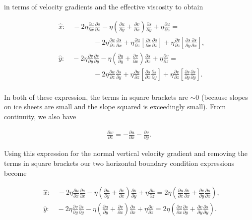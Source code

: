 in terms of velocity gradients and the effective viscosity to obtain

\begin{align*}
   {} & \hat{x}:\quad -2\eta \frac{\partial u}{\partial x}\frac{\partial s}{\partial x}-\eta \left( \frac{\partial u}{\partial y}+\frac{\partial v}{\partial x} \right)\frac{\partial s}{\partial y}+\eta \frac{\partial u}{\partial z}=  \\
   {} & \quad \quad \quad \quad \quad -2\eta \frac{\partial w}{\partial z}\frac{\partial s}{\partial x}+\eta \frac{\partial u}{\partial z}\left[ \frac{\partial s}{\partial x}\frac{\partial s}{\partial x} \right]+\eta \frac{\partial v}{\partial z}\left[ \frac{\partial s}{\partial y}\frac{\partial s}{\partial x} \right],  \\
%
   {} & \hat{y}:\quad -2\eta \frac{\partial v}{\partial y}\frac{\partial s}{\partial y}-\eta \left( \frac{\partial u}{\partial y}+\frac{\partial v}{\partial x} \right)\frac{\partial s}{\partial x}+\eta \frac{\partial v}{\partial z}=  \\
   {} & \quad \quad \quad \quad \quad -2\eta \frac{\partial w}{\partial z}\frac{\partial s}{\partial y}+\eta \frac{\partial u}{\partial z}\left[ \frac{\partial s}{\partial x}\frac{\partial s}{\partial y} \right]+\eta \frac{\partial v}{\partial z}\left[ \frac{\partial s}{\partial y}\frac{\partial s}{\partial y} \right].  \\
\end{align*}

In both of these expression, the terms in square brackets are $\sim{0}$ (because slopes on ice sheets are small and the slope squared is exceedingly small). From continuity, we also have

\begin{align*}
\frac{\partial w}{\partial z}=-\frac{\partial u}{\partial x}-\frac{\partial v}{\partial y}.
\end{align*}

Using this expression for the normal vertical velocity gradient and removing the terms in square brackets our two horizontal boundary condition expressions become

\begin{align*}
   {} & \hat{x}:\quad -2\eta \frac{\partial u}{\partial x}\frac{\partial s}{\partial x}-\eta \left( \frac{\partial u}{\partial y}+\frac{\partial v}{\partial x} \right)\frac{\partial s}{\partial y}+\eta \frac{\partial u}{\partial z}=2\eta \left( \frac{\partial u}{\partial x}\frac{\partial s}{\partial x}+\frac{\partial v}{\partial y}\frac{\partial s}{\partial x} \right),  \\
   {} & \hat{y}:\quad -2\eta \frac{\partial v}{\partial y}\frac{\partial s}{\partial y}-\eta \left( \frac{\partial u}{\partial y}+\frac{\partial v}{\partial x} \right)\frac{\partial s}{\partial x}+\eta \frac{\partial v}{\partial z}=2\eta \left( \frac{\partial u}{\partial x}\frac{\partial s}{\partial y}+\frac{\partial v}{\partial y}\frac{\partial s}{\partial y} \right).  \\
\end{align*}

